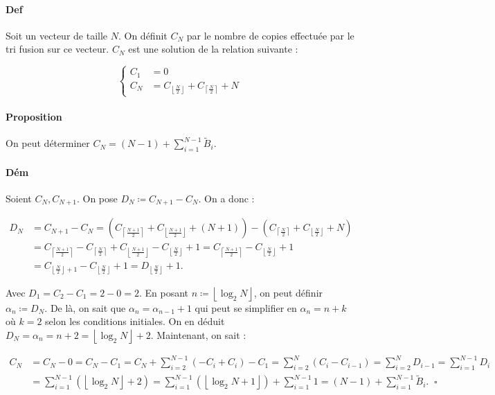 \documentclass{article}
\newcommand{\floor}[1]{{\left\lfloor#1\right\rfloor}}
\newcommand{\ceil}[1]{{\left\lceil#1\right\rceil}}
\begin{document}
			\paragraph{Def} Soit un vecteur de taille $N$. On définit $C_N$ par le nombre de copies effectuée par le tri fusion sur ce vecteur. $C_N$ est une solution de la relation suivante :

			\[\left\{\begin{aligned}C_1 &= 0\\C_N &= C_\floor{\frac N2} + C_\ceil{\frac N2} + N\end{aligned}\right.\]

			\paragraph{Proposition} On peut déterminer $C_N = (N-1) + \sum_{i=1}^{N-1}\widetilde B_i$.

			\paragraph{Dém} Soient $C_N, C_{N+1}$. On pose $D_N \coloneqq C_{N+1} - C_N$. On a donc :

			\begin{align*}
				D_N &= C_{N+1} - C_N = \left(C_\ceil{\frac {N+1}2} + C_\floor{\frac {N+1}2} + (N+1)\right) - \left(C_\ceil{\frac N2} + C_\floor{\frac N2} + N\right) \\
					&= C_\ceil{\frac {N+1}2} - C_\ceil{\frac N2} + C_\floor{\frac {N+1}2} - C_\floor{\frac N2} + 1 = C_\ceil{\frac {N+1}2} - C_\floor{\frac N2} + 1 \\
					&= C_{\floor{\frac N2}+1} - C_\floor{\frac N2} + 1 = D_\floor{\frac N2} + 1.
			\end{align*}

			Avec $D_1 = C_2 - C_1 = 2 - 0 = 2$. En posant $n \coloneqq \floor{\log_2 N}$, on peut définir $\alpha_n \coloneqq D_N$. De là, on sait que $\alpha_n = \alpha_{n-1} + 1$ qui peut
			se simplifier en $\alpha_n = n + k$ où $k = 2$ selon les conditions initiales. On en déduit $D_N = \alpha_n = n + 2 = \floor{\log_2 N} + 2$. Maintenant, on sait :

			\begin{align*}
				C_N &= C_N - 0 = C_N - C_1 = C_N + \sum_{i=2}^{N-1}(-C_i+C_i) - C_1 = \sum_{i=2}^{N}(C_i-C_{i-1}) = \sum_{i=2}^{N}D_{i-1} = \sum_{i=1}^{N-1}D_i \\
					&= \sum_{i=1}^{N-1}(\floor{\log_2 N} + 2) = \sum_{i=1}^{N-1}(\floor{\log_2 N + 1}) + \sum_{i=1}^{N-1}1 = (N-1) + \sum_{i=1}^{N-1}\widetilde B_i. \;\; \square
			\end{align*}
\end{document}
